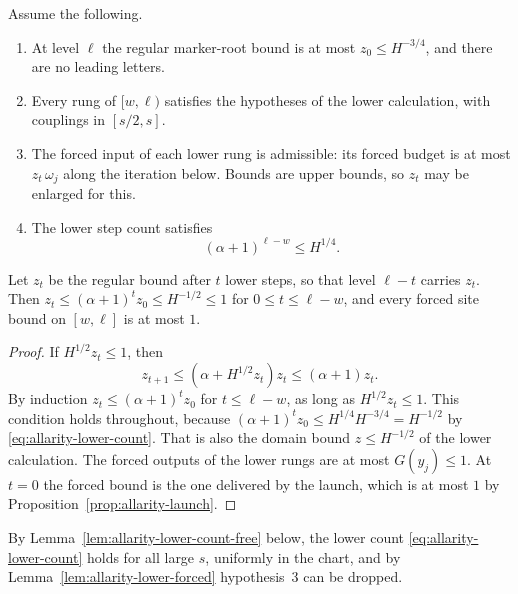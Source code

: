 \begin{lemma}\label{lem:allarity-lower-propagation}
Assume the following.
\begin{enumerate}
\item At level $\ell$ the regular marker-root bound is at most
 $z_0\le H^{-3/4}$, and there are no leading letters.
\item Every rung of $[w,\ell)$ satisfies the hypotheses of the lower
 calculation, with couplings in $[s/2,s]$.
\item The forced input of each lower rung is admissible:
 its forced budget is at most $z_t\,\omega_j$ along the iteration below.
 Bounds are upper bounds, so $z_t$ may be enlarged for this.
\item The lower step count satisfies
 \begin{equation}\label{eq:allarity-lower-count}
  (\alpha+1)^{\ell-w}\le H^{1/4}.
 \end{equation}
\end{enumerate}
Let $z_t$ be the regular bound after $t$ lower steps, so that level
$\ell-t$ carries $z_t$. Then $z_t\le(\alpha+1)^tz_0\le H^{-1/2}\le1$ for
$0\le t\le\ell-w$, and every forced site bound on $[w,\ell]$ is at most
$1$.
\end{lemma}
\begin{proof}
If $H^{1/2}z_t\le1$, then
\[
 z_{t+1}\le(\alpha+H^{1/2}z_t)z_t\le(\alpha+1)z_t .
\]
By induction $z_t\le(\alpha+1)^tz_0$ for $t\le\ell-w$, as long as
$H^{1/2}z_t\le1$. This condition holds throughout, because
$(\alpha+1)^tz_0\le H^{1/4}H^{-3/4}=H^{-1/2}$ by
\eqref{eq:allarity-lower-count}. That is also the domain bound
$z\le H^{-1/2}$ of the lower calculation. The forced outputs of the lower
rungs are at most $G(y_j)\le1$. At $t=0$ the forced bound is the one
delivered by the launch, which is at most $1$ by
Proposition~\ref{prop:allarity-launch}.
\end{proof}

By Lemma~\ref{lem:allarity-lower-count-free} below, the lower count
\eqref{eq:allarity-lower-count} holds for all large $s$, uniformly in the
chart, and by Lemma~\ref{lem:allarity-lower-forced} hypothesis~3 can be
dropped.

